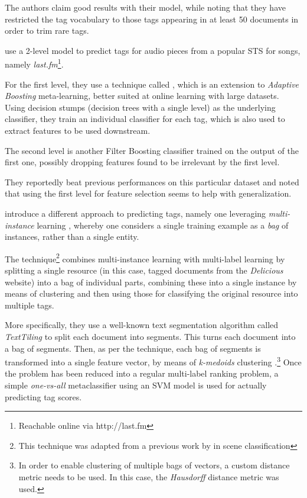 The authors claim good results with their model, while noting that they have restricted the tag vocabulary to those tags appearing in at least 50 documents in order to trim rare tags.

\cite{bertin-mahieux_etal_2008} use a 2-level model to predict tags for audio pieces from a popular STS for songs, namely \textit{last.fm}\footnote{Reachable online via http://last.fm}.

For the first level, they use a technique called , which is an extension to \textit{Adaptive Boosting} meta-learning, better suited at online learning with large datasets. Using decision stumps (decision trees with a single level) as the underlying classifier, they train an individual classifier for each tag, which is also used to extract features to be used downstream.

The second level is another Filter Boosting classifier trained on the output of the first one, possibly dropping features found to be irrelevant by the first level.

They reportedly beat previous performances on this particular dataset and noted that using the first level for feature selection seems to help with generalization.

\cite{shen_etal_2009} introduce a different approach to predicting tags, namely one leveraging \textit{multi-instance} learning \citep{dietterich_etal_1997}, whereby one considers a single training example as a \textit{bag} of instances, rather than a single entity.

The technique\footnote{This technique was adapted from a previous work by \cite{zhou_zhang_2006} in scene classification} combines multi-instance learning with multi-label learning by splitting a single resource (in this case, tagged documents from the \textit{Delicious} website) into a bag of individual parts, combining these into a single instance by means of clustering and then using those for classifying the original resource into multiple tags.

More specifically, they use a well-known text segmentation algorithm called \textit{TextTiling} \citep{hearst_1994} to split each document into segments. This turns each document into a bag of segments. Then, as per the technique, each bag of segments is transformed into a single feature vector, by means of \textit{k-medoids} clustering \citep{kaufmanl_rousseeuw_1987}.\footnote{In order to enable clustering of multiple bags of vectors, a custom distance metric needs to be used. In this case, the  \textit{Hausdorff} distance metric \citep{huttenlocher_etal_1993} was used.} Once the problem has been reduced into a regular multi-label ranking problem, a simple \textit{one-vs-all} metaclassifier using an SVM model is used for actually predicting  tag scores.

